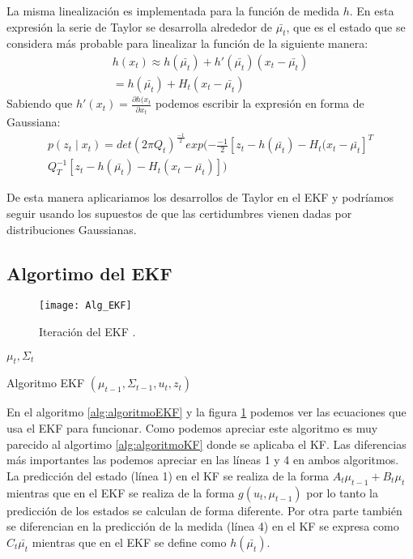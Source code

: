 La misma linealización es implementada para la función de medida $h$.
En esta expresión la serie de Taylor se desarrolla alrededor de $\bar{\mu_{t}}$, que es el estado que se considera más probable para linealizar la función de la siguiente manera:
\begin{eqnarray}\label{Ec:Prob_Taylor_h}
\nonumber h(x_{t}) \approx h(\bar{\mu_{t}}) + h'(\bar{\mu_{t}})(x_{t}-\bar{\mu_{t}}) \\
= h(\bar{\mu_{t}}) + H_{t}(x_{t}- \bar{\mu_{t}}) 
\end{eqnarray}
Sabiendo que $h'(x_{t})=\frac{\partial h(x_{t}}{\partial x_{t}}$ podemos escribir la expresión en forma de Gaussiana:
\begin{eqnarray}\label{Ec:Prob_Taylor_h_Gauss}
\nonumber p(z_{t} \mid x_{t}) = det(2\pi Q_{t})^\frac{-1}{2} exp(-\frac{-1}{2}[z_{t}-h(\bar{\mu_{t}})-H_{t}(x_{t}-\bar{\mu_{t}}]^{T} \\
Q_{T}^{-1}[z_{t}-h(\bar{\mu_{t}})-H_{t}(x_{t}-\bar{\mu_{t}})])
\end{eqnarray}

De esta manera aplicariamos los desarrollos de Taylor en el \ac{EKF} y podríamos seguir usando los supuestos de que las certidumbres vienen dadas por distribuciones Gaussianas.

\subsection{Algortimo del EKF}
\begin{figure}[ht!]
\centering
\texttt{[image: Alg\_EKF]}
\caption{Iteración del EKF \cite{leonardo_navegacion_2011} \cite{AnIntroductionToTheKalmanFilter}.} \label{Iteracion_EKF}
\end{figure}
\begin{algorithm}
\begin{algorithmic} 
\RETURN $\mu_{t},\Sigma_{t}$
\end{algorithmic}
\caption{Algoritmo EKF \cite{thrun_probabilistic_2005} $(\mu_{t-1},\Sigma_{t-1},u_{t},z_{t})$}\label{alg:algoritmoEKF}
\end{algorithm}

En el algoritmo \ref{alg:algoritmoEKF} y la figura \ref{Iteracion_EKF} podemos ver las ecuaciones que usa el \ac{EKF} para funcionar.
Como podemos apreciar este algoritmo es muy parecido al algortimo \ref{alg:algoritmoKF} donde se aplicaba el \ac{KF}.
Las diferencias más importantes las podemos apreciar en las líneas 1 y 4 en ambos algoritmos.
La predicción del estado (línea 1) en el \ac{KF} se realiza de la forma $A_{t}\mu_{t-1}+ B_{t}\mu_{t}$ mientras que en el \ac{EKF} se realiza de la forma $g(u_{t},\mu_{t-1})$ por lo tanto la predicción de los estados se calculan de forma diferente.
Por otra parte también se diferencian en la predicción de la medida (línea 4) en el \ac{KF} se expresa como $C_{t}\bar{\mu_{t}}$ mientras que en el \ac{EKF} se define como $h(\bar{\mu_{t}})$.

